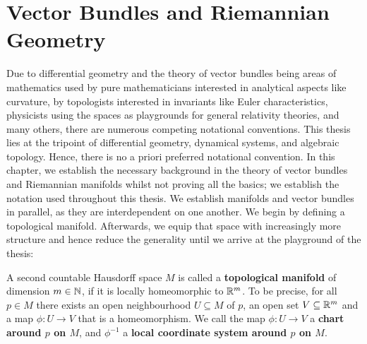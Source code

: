 	\section{Vector Bundles and Riemannian Geometry}
\label{sec:background-geometry}
Due to differential geometry and the theory of vector bundles being areas of mathematics used by pure mathematicians interested in analytical aspects like curvature, by topologists interested in invariants like Euler characteristics, physicists using the spaces as playgrounds for general relativity theories, and many others, there are numerous competing notational conventions. This thesis lies at the tripoint of differential geometry, dynamical systems, and algebraic topology. Hence, there is no a priori preferred notational convention.
In this chapter, we establish the necessary background in the theory of vector bundles and Riemannian manifolds whilst not proving all the basics; we establish the notation used throughout this thesis. We establish manifolds and vector bundles in parallel, as they are interdependent on one another.
We begin by defining a topological manifold. Afterwards, we equip that space with increasingly more structure and hence reduce the generality until we arrive at the playground of the thesis: 

\begin{definition} \label{def:vb-topologicalManifold}
	A second countable Hausdorff space $M$ is called a \textbf{topological manifold} of dimension $m\in \mathbb{N}$, if it is locally homeomorphic to $\mathbb{R}^m$. To be precise, for all $p\in M$ there exists an open neighbourhood $U\subseteq M$ of $p$, an open set $V\subseteq \mathbb{R}^m$  and a map $\phi:U\to V$ that is a homeomorphism. We call the map $\phi:U\to V$ a \textbf{chart around $p$ on $M$}, and $\phi^{-1}$ a \textbf{local coordinate system around $p$ on $M$}.
\end{definition}

